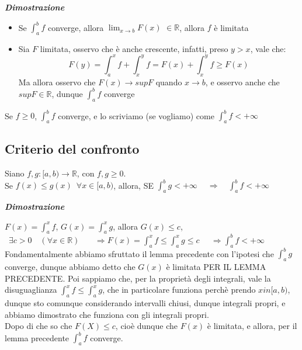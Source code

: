 \documentclass{article}
\theoremstyle{definition}
\newcommand{\R}{\mathbb{R}}
\begin{document}
\begin{center}
    \textbf{\textit{Dimostrazione}}
\end{center}
\begin{itemize}
    \item Se $\int_a^bf$ converge, allora $\lim_{x \to b}F(x) \,\, \in \R$, allora $f$ è limitata
    \item Sia $F$ limitata, osservo che è anche crescente, infatti, preso $y >x$, vale che:
    \begin{equation*}
        F(y)=\int_a^x f+ \int_x^y f=F(x)+\int_x^y f \geqslant F(x)
    \end{equation*}
    Ma allora osservo che $F(x) \to supF$ quando $x \to b$, e osservo anche che $supF \in \R$, dunque $\int_a^b f$ converge
\end{itemize}

\begin{center}
    Se $f \geqslant 0$, $\int_a^b f$ converge, e lo scriviamo (se vogliamo) come $\int_a^b f < +\infty$
\end{center}

\subsection{Criterio del confronto}
Siano $f,g:[a,b) \to \R$, con $f,g \geqslant 0$.
\\
Se $f(x) \leqslant g(x) \,\,\, \forall x \in [a,b)$, allora, SE $\int_a^b g < +\infty \,\,\,\,\,\,\ \Longrightarrow \,\,\,\,\,\, \int_a^b f < +\infty$

\begin{center}
    \textbf{\textit{Dimostrazione}}
\end{center}
$F(x)=\int_a^x f$, $G(x)=\int_a^x g$, allora $G(x) \leqslant c$, $\,\,\, \exists c > 0 \,\,\,\,\,\, (\forall x \in \R)\,\,\,\,\,\,\,\,\,\,\, \Longrightarrow F(x)=\int_a^x f \leqslant \int_a^x g \leqslant c \,\,\,\,\,\,\,\ \Longrightarrow \int_a^b f < +\infty$
\\
Fondamentalmente abbiamo sfruttato il lemma precedente con l'ipotesi che $\int_a^b g$ converge, dunque abbiamo detto che $G(x)$ è limitata PER IL LEMMA PRECEDENTE. Poi sappiamo che, per la proprietà degli integrali, vale la disuguaglianza $\int_a^x f \leqslant \int_a^x g$, che in particolare funziona perchè prendo $x in [a,b)$, dunque sto comunque considerando intervalli chiusi, dunque integrali propri, e abbiamo dimostrato che funziona con gli integrali propri.
\\
Dopo di che so che $F(X) \leqslant c$, cioè dunque che $F(x)$ è limitata, e allora, per il lemma precedente $\int_a^b f$ converge.
\\
\end{document}
